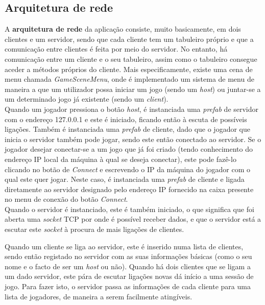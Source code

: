 \subsection{Arquitetura de rede}
\label{chap4:subsec:rede}
A \textbf{arquitetura de rede} da aplicação consiste, muito basicamente, em dois clientes e um servidor, sendo que cada cliente tem um tabuleiro próprio e que a comunicação entre clientes é feita por meio do servidor. No entanto, há comunicação entre um cliente e o seu tabuleiro, assim como o tabuleiro consegue aceder a métodos próprios do cliente. 
Mais especificamente, existe uma cena de menu chamada \emph{GameSceneMenu}, onde é implementado um sistema de menu de maneira a que um utilizador possa iniciar um jogo (sendo um \emph{host}) ou juntar-se a um determinado jogo já existente (sendo um \emph{client}).  \\ 

Quando um jogador pressiona o botão \textit{host}, é instanciada uma \textit{prefab} de servidor com o endereço 127.0.0.1 e este é iniciado, ficando então à escuta de possíveis ligações. Também é instanciada uma \textit{prefab} de cliente, dado que o jogador que inicia o servidor também pode jogar, sendo este então conectado ao servidor. Se o jogador desejar conectar-se a um jogo que já foi criado (tendo conhecimento do endereço \ac{IP} local da máquina à qual se deseja conectar), este pode fazê-lo clicando no botão de \emph{Connect} e escrevendo o \ac{IP} da máquina do jogador com o qual este quer jogar.
Neste caso, é instanciada uma \textit{prefab} de cliente e ligada diretamente ao servidor designado pelo endereço \ac{IP} fornecido na caixa presente no menu de conexão do botão \emph{Connect}. \\ 

Quando o servidor é instanciado, este é também iniciado, o que significa que foi aberta uma \textit{socket} \ac{TCP} por onde é possível receber dados, e que o servidor está a escutar este \textit{socket} à procura de mais ligações de clientes.

Quando um cliente se liga ao servidor, este é inserido numa lista de clientes, sendo então registado no servidor com as suas informações básicas (como o seu nome e o facto de ser um \emph{host} ou não). Quando há dois clientes que se ligam a um dado servidor, este pára de escutar ligações novas dá início a uma sessão de jogo. Para fazer isto, o servidor passa as informações de cada cliente para uma lista de jogadores, de maneira a serem facilmente atingíveis. \\ 

